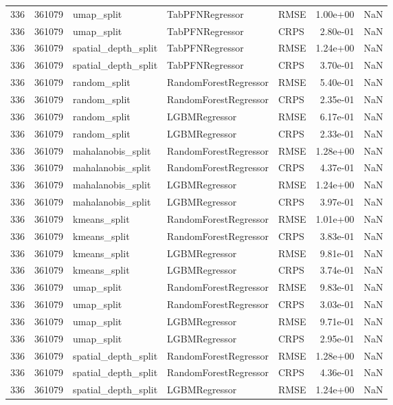 \begin{tabular}{rrlllrr}
336 & 361079 & umap\_split & TabPFNRegressor & RMSE & 1.00e+00 & NaN \\
336 & 361079 & umap\_split & TabPFNRegressor & CRPS & 2.80e-01 & NaN \\
336 & 361079 & spatial\_depth\_split & TabPFNRegressor & RMSE & 1.24e+00 & NaN \\
336 & 361079 & spatial\_depth\_split & TabPFNRegressor & CRPS & 3.70e-01 & NaN \\
336 & 361079 & random\_split & RandomForestRegressor & RMSE & 5.40e-01 & NaN \\
336 & 361079 & random\_split & RandomForestRegressor & CRPS & 2.35e-01 & NaN \\
336 & 361079 & random\_split & LGBMRegressor & RMSE & 6.17e-01 & NaN \\
336 & 361079 & random\_split & LGBMRegressor & CRPS & 2.33e-01 & NaN \\
336 & 361079 & mahalanobis\_split & RandomForestRegressor & RMSE & 1.28e+00 & NaN \\
336 & 361079 & mahalanobis\_split & RandomForestRegressor & CRPS & 4.37e-01 & NaN \\
336 & 361079 & mahalanobis\_split & LGBMRegressor & RMSE & 1.24e+00 & NaN \\
336 & 361079 & mahalanobis\_split & LGBMRegressor & CRPS & 3.97e-01 & NaN \\
336 & 361079 & kmeans\_split & RandomForestRegressor & RMSE & 1.01e+00 & NaN \\
336 & 361079 & kmeans\_split & RandomForestRegressor & CRPS & 3.83e-01 & NaN \\
336 & 361079 & kmeans\_split & LGBMRegressor & RMSE & 9.81e-01 & NaN \\
336 & 361079 & kmeans\_split & LGBMRegressor & CRPS & 3.74e-01 & NaN \\
336 & 361079 & umap\_split & RandomForestRegressor & RMSE & 9.83e-01 & NaN \\
336 & 361079 & umap\_split & RandomForestRegressor & CRPS & 3.03e-01 & NaN \\
336 & 361079 & umap\_split & LGBMRegressor & RMSE & 9.71e-01 & NaN \\
336 & 361079 & umap\_split & LGBMRegressor & CRPS & 2.95e-01 & NaN \\
336 & 361079 & spatial\_depth\_split & RandomForestRegressor & RMSE & 1.28e+00 & NaN \\
336 & 361079 & spatial\_depth\_split & RandomForestRegressor & CRPS & 4.36e-01 & NaN \\
336 & 361079 & spatial\_depth\_split & LGBMRegressor & RMSE & 1.24e+00 & NaN \\

\end{tabular}
